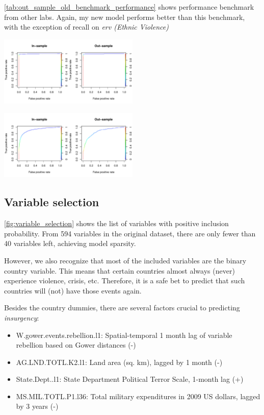 \documentclass[a0,portrait]{a0poster}
\begin{document}
\begin{multicols}{2}
\autoref{tab:out_sample_old_benchmark_performance} shows performance benchmark from other labs. Again, my new model performs better than this benchmark, with the exception of recall on \textit{erv (Ethnic Violence)}
\begin{center}

\label{tab:out_sample_old_benchmark_performance}
\end{center}

\begin{center}
\includegraphics[width=0.5\textwidth]{roc_insurgency}
\label{fig:roc_insurgency}
\end{center}

\begin{center}
\includegraphics[width=0.5\textwidth]{roc_dpc}
\label{fig:roc_dpc}
\end{center}

\subsection*{Variable selection}

\autoref{fig:variable_selection} shows the list of variables with positive inclusion probability. From 594 variables in the original dataset, there are only fewer than 40 variables left, achieving model sparsity.

However, we also recognize that most of the included variables are the binary country variable. This means that certain countries almost always (never) experience violence, crisis, etc. Therefore, it is a safe bet to predict that such countries will (not) have those events again.

Besides the country dummies, there are several factors crucial to predicting \textit{insurgency}:
\begin{itemize}
\item W.gower.events.rebellion.l1: Spatial-temporal 1 month lag of variable rebellion based on Gower distances (-)
\item AG.LND.TOTL.K2.l1: Land area (sq. km), lagged by 1 month (-)
\item State.Dept..l1: State Department Political Terror Scale, 1-month lag (+)
\item MS.MIL.TOTL.P1.l36: Total military expenditures in 2009 US dollars, lagged by 3 years (-)
\end{itemize}


\end{multicols}
\end{document}
